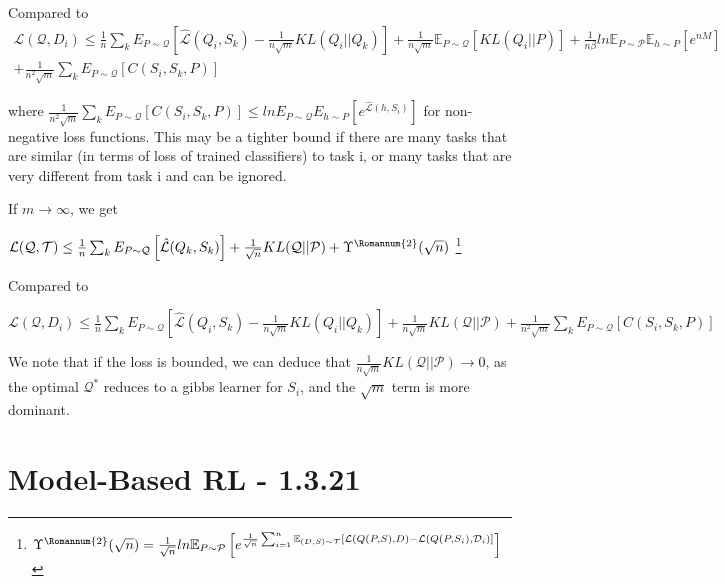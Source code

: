 \documentclass[letterpaper]{article}
\theoremstyle{definition}
\begin{document}
Compared to 
\begin{equation*}
\begin{split}
\mathcal{L}(\mathcal{Q}, D_i)\leq \frac{1}{n}\sum_k E_{P\sim \mathcal{Q}}  \left [ \hat{\mathcal{L}}(Q_i,S_k) -\frac{1}{n\sqrt{m}}KL(Q_i||Q_k)\right ]  + \frac{1}{n\sqrt{m}}\mathbb{E}_{P\sim \mathcal{Q}} \left [KL(Q_i||P)\right ] + \frac{1}{n\beta} ln\mathbb{E}_{P\sim \mathcal{P}}\mathbb{E}_{h\sim P}\left [ e^{nM}\right ] \\+\frac{1}{n^2\sqrt{m}}\sum_k E_{P\sim \mathcal{Q}} \left [C(S_i,S_k,P)\right ]  
\end{split}
\end{equation*}

where $\frac{1}{n^2\sqrt{m}}\sum_k E_{P\sim \mathcal{Q}} \left [C(S_i,S_k,P)\right ] \leq  lnE_{P\sim \mathcal{Q}}E_{h\sim P}\left [ e^{\hat{\mathcal{L}}(h,S_i)}\right ]$ for non-negative loss functions. 
This may be a tighter bound if there are many tasks that are similar (in terms of loss of trained classifiers) to task i, or many tasks that are very different from task i and can be ignored.

If $m\rightarrow\infty$, we get

$\mathcal{L}(\mathcal{Q}, \mathcal{T}) \leq \frac{1}{n}\sum_k E_{P\sim \mathcal{Q}} \left [ \hat{\mathcal{L}}(Q_k,S_k) \right ]+ \frac{1}{\sqrt{n}}KL(\mathcal{Q}||\mathcal{P}) + \Upsilon^{\text{\Romannum{2}}}(\sqrt{n})$ 
\footnote{$\Upsilon^{\text{\Romannum{2}}}(\sqrt{n})=\frac{1}{\sqrt{n}}ln \mathbb{E}_{P\sim \mathcal{P}} \left [e^{\frac{1}{\sqrt{n}}\sum_{i=1}^{n}\mathbb{E}_{(D,S)\sim \mathcal{T}}\left [\mathcal{L}(Q(P,S),D)- \mathcal{L}(Q(P, S_i), \mathcal{D}_i)\right ]} \right ]$}

Compared to 

$\mathcal{L}(\mathcal{Q}, D_i)\leq \frac{1}{n}\sum_k E_{P\sim \mathcal{Q}}  \left [ \hat{\mathcal{L}}(Q_i,S_k)  -\frac{1}{n\sqrt{m}}KL(Q_i||Q_k)\right ] + \frac{1}{n\sqrt{m}}KL(\mathcal{Q}||\mathcal{P}) + \frac{1}{n^2\sqrt{m}}\sum_k E_{P\sim \mathcal{Q}} \left [C(S_i,S_k,P)\right ] $

We note that if the loss is bounded, we can deduce that $\frac{1}{n\sqrt{m}}KL(\mathcal{Q}||\mathcal{P})\rightarrow 0$, as the optimal $\mathcal{Q}^*$ reduces to a gibbs learner for $S_i$, and the $\sqrt{m}$ term is more dominant.





\section{Model-Based RL - 1.3.21} \label{sec:mbrl}
\end{document}
